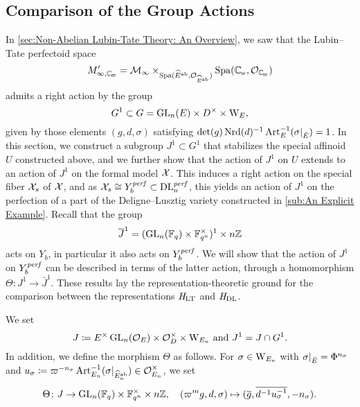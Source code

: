 \documentclass[../main.tex]{subfiles}
\begin{document}

\subsection{Comparison of the Group Actions} %
\label{sub:Proof of Proposition}
In \cref{sec:Non-Abelian Lubin-Tate Theory: An Overview}, we saw that
the Lubin--Tate perfectoid space 
$$M'_{\infty, \Cp} = \cM_{\infty} \times_{\Spa(\hat E^\ab, \cO_{\hat
E^\ab})} \Spa(\Cp, \cO_\Cp)$$ 
admits a right action by the group
\begin{equation*}
  G^1 \subset G = \operatorname{GL}_n(E) \times D^\times \times \mathrm W_E,
\end{equation*}
given by those elements $(g,d,\sigma)$ satisfying $\det(g) \operatorname{Nrd}(d)^{-1} \operatorname{Art}_E^{-1}(\sigma|_{\breve {E}}) = 1$.
In this section, we construct a subgroup $J^1 \subset G^1$ that stabilizes the
special affinoid $U$ constructed above, and we further show that
the action of $J^1$ on $U$ extends to an action of $J^1$ on the formal model
$\mathcal{X}$. This induces a right action on the special fiber
$\mathcal{X}_s$ of $\mathcal{X}$, and as $\mathcal{X}_s \cong Y_b^{\mathit{perf}} \subset \mathrm{DL}_n^{\mathit{perf}}$, this
yields an action of $J^1$ on the perfection of a part of the Deligne--Lusztig
variety constructed in \cref{sub:An Explicit Example}. Recall that the group 
\begin{equation*}
  \overline J^1 = (\operatorname{GL}_n(\mathbb{F}_q) \times \mathbb{F}_{q^n}^\times)^1 \times n\mathbb{Z}
\end{equation*}
acts on $Y_b$, in particular it also acts on 
$Y_b^{\mathit{perf}}$. We will show that the action of $J^1$ on $Y_b^{\mathit{perf}}$
can be described in terms of the latter action, through a homomorphism
$\Theta\colon J^1 \to \bar J^1$. These
results lay the representation-theoretic ground for the comparison between the
representations $\mathit H_{\mathrm{LT}}$ and $\mathit H_\mathrm{DL}$.

We set 
\begin{equation} \label{eq:defJandJ1}
  J \coloneqq E^\times \operatorname{GL}_n(\mathcal{O}_E) \times \mathcal{O}_D^\times \times \mathrm W_{E_n}
  \text{ and } J^1 = J \cap G^1.
\end{equation}
In addition, we define the morphism $\Theta$ as follows. For $\sigma \in \mathrm W_{E_n}$ with
$\sigma|_{\breve {E}} = \Phi^{n_\sigma}$ and $u_\sigma \coloneq \varpi^{-n_\sigma}
\operatorname{Art}^{-1}_{E_n}(\sigma|_{\widehat E_n^{\mathrm{ab}}}) \in \mathcal{O}_{E_n}^\times$, we set
\begin{equation}\label{eq:ThetaMorDef}
  \Theta \colon J \to \operatorname{GL}_n(\mathbb{F}_q) \times \mathbb{F}_{q^n}^\times \times {n\mathbb{Z}}, \quad
  (\varpi^m g,d,\sigma) \mapsto (\overline g, \overline {d^{-1}u_\sigma^{-1}}, -n_\sigma).
\end{equation}
\end{document}
